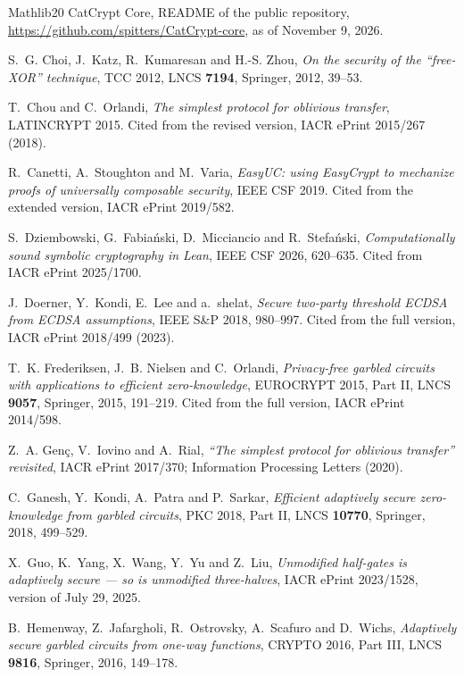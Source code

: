\begin{thebibliography}{Mathlib20}
CatCrypt Core, README of the public repository, \url{https://github.com/spitters/CatCrypt-core},
as of November 9, 2026.

S.~G. Choi, J.~Katz, R.~Kumaresan and H.-S. Zhou, \emph{On the security of the ``free-XOR''
technique}, TCC 2012, LNCS \textbf{7194}, Springer, 2012, 39--53.

T.~Chou and C.~Orlandi, \emph{The simplest protocol for oblivious transfer}, LATINCRYPT 2015.
Cited from the revised version, IACR ePrint 2015/267 (2018).

R.~Canetti, A.~Stoughton and M.~Varia, \emph{EasyUC: using EasyCrypt to mechanize proofs of
universally composable security}, IEEE CSF 2019. Cited from the extended version, IACR ePrint
2019/582.

S.~Dziembowski, G.~Fabia\'nski, D.~Micciancio and R.~Stefa\'nski, \emph{Computationally sound
symbolic cryptography in Lean}, IEEE CSF 2026, 620--635. Cited from IACR ePrint 2025/1700.

J.~Doerner, Y.~Kondi, E.~Lee and a.~shelat, \emph{Secure two-party threshold ECDSA from ECDSA
assumptions}, IEEE S\&P 2018, 980--997. Cited from
the full version, IACR ePrint 2018/499 (2023).

T.~K. Frederiksen, J.~B. Nielsen and C.~Orlandi, \emph{Privacy-free garbled circuits with
applications to efficient zero-knowledge}, EUROCRYPT 2015, Part II, LNCS \textbf{9057},
Springer, 2015, 191--219. Cited from the full version, IACR ePrint 2014/598.

Z.~A. Genç, V.~Iovino and A.~Rial, \emph{``The simplest protocol for oblivious transfer''
revisited}, IACR ePrint 2017/370; Information Processing Letters (2020).

C.~Ganesh, Y.~Kondi, A.~Patra and P.~Sarkar, \emph{Efficient adaptively secure zero-knowledge from
garbled circuits}, PKC 2018, Part II, LNCS \textbf{10770}, Springer, 2018, 499--529.

X.~Guo, K.~Yang, X.~Wang, Y.~Yu and Z.~Liu, \emph{Unmodified half-gates is adaptively secure
--- so is unmodified three-halves}, IACR ePrint 2023/1528, version of July 29, 2025.

B.~Hemenway, Z.~Jafargholi, R.~Ostrovsky, A.~Scafuro and D.~Wichs, \emph{Adaptively secure garbled
circuits from one-way functions}, CRYPTO 2016, Part III, LNCS \textbf{9816}, Springer, 2016, 149--178.


\end{thebibliography}
